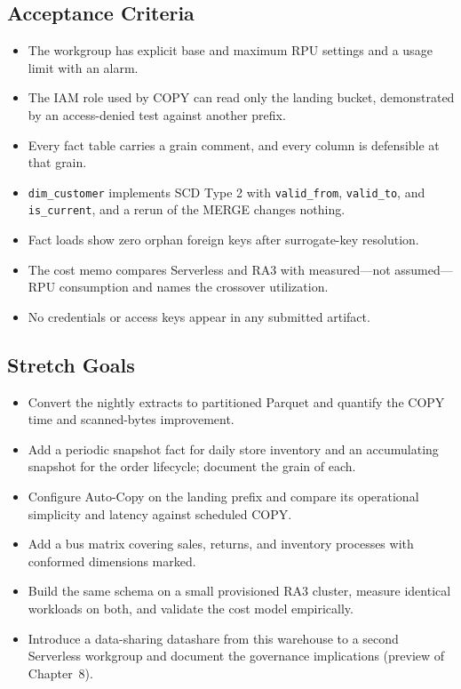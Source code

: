 \subsection*{Acceptance Criteria}
\begin{itemize}
    \item The workgroup has explicit base and maximum RPU settings and a usage limit with an alarm.
    \item The IAM role used by COPY can read only the landing bucket, demonstrated by an access-denied test against another prefix.
    \item Every fact table carries a grain comment, and every column is defensible at that grain.
    \item \texttt{dim\_customer} implements SCD Type 2 with \texttt{valid\_from}, \texttt{valid\_to}, and \texttt{is\_current}, and a rerun of the MERGE changes nothing.
    \item Fact loads show zero orphan foreign keys after surrogate-key resolution.
    \item The cost memo compares Serverless and RA3 with measured---not assumed---RPU consumption and names the crossover utilization.
    \item No credentials or access keys appear in any submitted artifact.
\end{itemize}

\subsection*{Stretch Goals}
\begin{itemize}
    \item Convert the nightly extracts to partitioned Parquet and quantify the COPY time and scanned-bytes improvement.
    \item Add a periodic snapshot fact for daily store inventory and an accumulating snapshot for the order lifecycle; document the grain of each.
    \item Configure Auto-Copy on the landing prefix and compare its operational simplicity and latency against scheduled COPY.
    \item Add a bus matrix covering sales, returns, and inventory processes with conformed dimensions marked.
    \item Build the same schema on a small provisioned RA3 cluster, measure identical workloads on both, and validate the cost model empirically.
    \item Introduce a data-sharing datashare from this warehouse to a second Serverless workgroup and document the governance implications (preview of Chapter~8).
\end{itemize}
